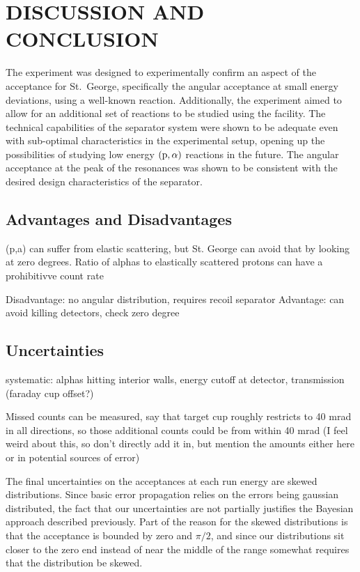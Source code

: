 \chapter{DISCUSSION AND CONCLUSION}
\label{ch:discussion-and-conclusion}

The experiment was designed to experimentally confirm an aspect of the
acceptance for St.\ George, specifically the angular acceptance at small
energy deviations, using a well-known reaction. Additionally, the
experiment aimed to allow for an additional set of reactions to be
studied using the facility. The technical capabilities of the separator
system were shown to be adequate even with sub-optimal characteristics
in the experimental setup, opening up the possibilities of studying low
energy $(\rm{p},\alpha)$ reactions in the future. The angular acceptance at the
peak of the resonances was shown to be consistent with the desired design
characteristics of the separator.


\section{Advantages and Disadvantages}
(p,a) can suffer from elastic scattering, but St. George can avoid that by
looking at zero degrees. Ratio of alphas to elastically scattered protons
can have a prohibitivve count rate

Disadvantage: no angular distribution, requires recoil separator
Advantage: can avoid killing detectors, check zero degree


\section{Uncertainties}
\label{sec:uncertainties}


systematic: alphas hitting interior walls, energy cutoff at detector,
transmission (faraday cup offset?)

Missed counts can be measured, say that target cup roughly restricts to 40 mrad
in all directions, so those additional counts could be from within 40 mrad (I
feel weird about this, so don't directly add it in, but mention the amounts
either here or in potential sources of error)


The final uncertainties on the acceptances at each run energy are skewed
distributions. Since basic error propagation relies on the errors being
gaussian distributed, the fact that our uncertainties are not partially
justifies the Bayesian approach described previously. Part of the reason
for the skewed distributions is that the acceptance is bounded by zero
and $\pi/2$, and since our distributions sit closer to the zero end instead
of near the middle of the range somewhat requires that the distribution
be skewed.

